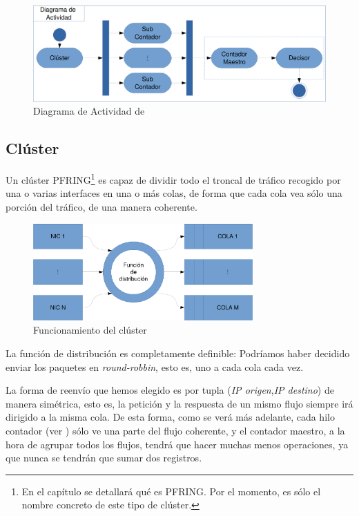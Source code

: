 \begin{figure}[htbp]
\centering
\includegraphics[width=\textwidth]{CapituloEstructura/Figuras/DiagramaFlow-crop}
\caption{Diagrama de Actividad de \redborderddos}
\end{figure}
%

\subsection{Clúster}
Un clúster \acrshort{PFRING}\footnote{En el capítulo  se detallará qué es \acrshort{PFRING}. Por el 
momento, es sólo el nombre concreto de este tipo de clúster.} es capaz de dividir todo el troncal de tráfico recogido 
por una o varias interfaces en una o más colas, de forma que cada cola vea sólo una porción del tráfico, de una manera 
coherente.

\begin{figure}[htbp]
\centering
\includegraphics[width=0.75\textwidth]{CapituloEstructura/Figuras/Cluster-crop}
\caption{Funcionamiento del clúster}
\end{figure}
%

La función de distribución es completamente definible: Podríamos haber decidido enviar los paquetes en 
\emph{round-robbin}, esto es, uno a cada cola cada vez.

La forma de reenvío que hemos elegido es por tupla (\emph{IP origen},\emph{IP destino}) de manera simétrica, esto es, 
la petición y la respuesta de un mismo flujo siempre irá dirigido a la misma cola. De esta forma, como se verá más 
adelante, cada hilo contador (ver ) sólo ve una parte del flujo coherente, y el contador maestro, a 
la hora de agrupar todos los flujos, tendrá que hacer muchas menos operaciones, ya que nunca se tendrán que sumar dos 
registros.

